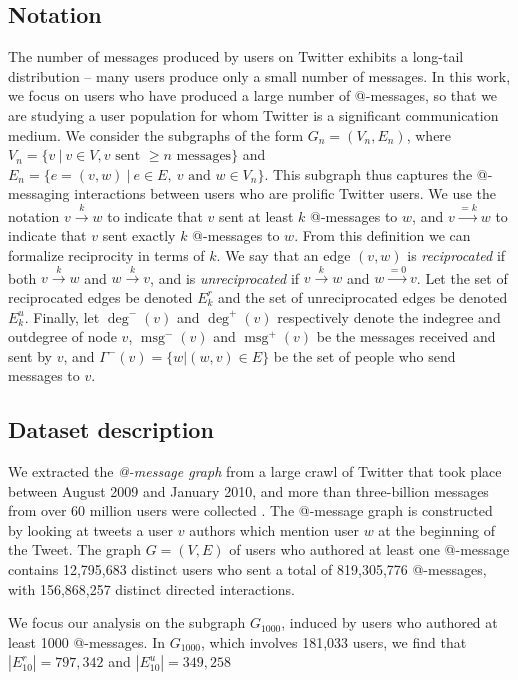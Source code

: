 \documentclass[conference]{IEEEtran}
\begin{document}
\subsection{Notation}
The number of messages produced by users on 
Twitter exhibits a long-tail distribution -- many users produce only a small number of messages.
In this work, we focus on users who have produced 
a large number of @-messages, so that we are studying 
a user population for whom Twitter is a significant communication medium.
We consider the subgraphs of the form $G_n = (V_n, E_n)$, where $V_n = \{v~|~v \in V, v \text{ sent } \ge n \text{ messages}\}$ and $E_n = \{e=(v,w)~|~e \in E,~v \text{ and } w \in V_n\}$.
This subgraph thus captures the @-messaging interactions between users who are prolific Twitter users.
We use the notation $v \xrightarrow{k} w$ to indicate that $v$ sent at least $k$ @-messages to $w$, and $v \xrightarrow{=k} w$ to indicate that $v$ sent exactly $k$ @-messages to $w$. 
From this definition we can formalize reciprocity in terms of $k$. 
We say that an edge $(v,w)$ is {\em reciprocated} 
if both $v \xrightarrow{k} w$ and $w \xrightarrow{k} v$, and 
is {\em unreciprocated} if $v \xrightarrow{k} w$ and $w \xrightarrow{=0} v$.
Let the set of reciprocated edges be denoted $E_k^r$
and the set of unreciprocated edges be denoted $E_k^u$.
Finally, let $\deg^-(v)$ and $\deg^+(v)$ respectively denote the indegree and outdegree of node $v$, $\operatorname{msg}^-(v)$ and $\operatorname{msg}^+(v)$ be the messages received and sent by $v$, and $\Gamma^-(v) = \{w| (w,v) \in E\}$ be the set of people who send messages to $v$.

\subsection{Dataset description}
We extracted the \emph{@-message graph} from a large crawl of Twitter that took place between August 2009 and January 2010, and more than three-billion messages from over 60 million users were collected \cite{Romero:2011:DMI:1963405.1963503}.
The @-message graph is constructed by looking at tweets a user $v$ authors which mention user $w$ at the beginning of the Tweet.  
The graph $G = (V,E)$ of users who authored at least one @-message 
contains 12,795,683 distinct users who sent a total 
of 819,305,776 @-messages, with 156,868,257 distinct directed interactions. 

We focus our analysis on the subgraph $G_{1000}$, induced by users who authored at least 1000 @-messages.
In $G_{1000}$, which involves 181,033 users, we find that $|E^r_{10}| = 797,342$ and $|E^u_{10}| = 349,258$
\end{document}
